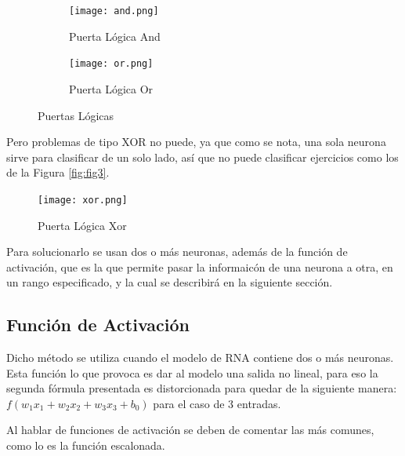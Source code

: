         \begin{figure}[H]
            \begin{subfigure}[H]{0.49\textwidth}
                \texttt{[image: and.png]}
                \caption{Puerta L\'ogica And}
                \label{fig:f1}
            \end{subfigure}
            \hfill
            \begin{subfigure}[H]{0.49\textwidth}
                \texttt{[image: or.png]}
                \caption{Puerta L\'ogica Or}
                \label{fig:f2}  %
            \end{subfigure}
            \caption{Puertas L\'ogicas}
        \end{figure}
        
        Pero problemas de tipo XOR no puede, ya que como se nota, una sola neurona sirve para 
        clasificar de un solo lado, así que no puede clasificar ejercicios
        como los de la Figura \eqref{fig:fig3}.

        \begin{figure}[H]
            \centering
            \texttt{[image: xor.png]}
            \caption{Puerta L\'ogica Xor}
            \label{fig:fig3}
        \end{figure}

        Para solucionarlo se usan dos o m\'as neuronas, adem\'as de la funci\'on de activaci\'on, que es la que permite pasar la informaicón de una neurona a otra, en un rango especificado, y la cual se describirá en la siguiente sección.

            \subsection{Funci\'on de Activaci\'on} \label{sec: activation}
            
            
                Dicho m\'etodo se utiliza cuando el modelo de RNA contiene dos o m\'as neuronas.
                Esta funci\'on lo que provoca es dar al modelo una salida no lineal, para 
                eso la segunda f\'ormula presentada es distorcionada para quedar de la siguiente 
                manera: $f( w_1x_1 + w_2x_2 + w_3x_3 + b_0)$ para el caso de 3 entradas.              
                
                
                Al hablar de funciones de activaci\'on se deben de comentar las m\'as comunes, como lo es la 
                funci\'on escalonada.
                
